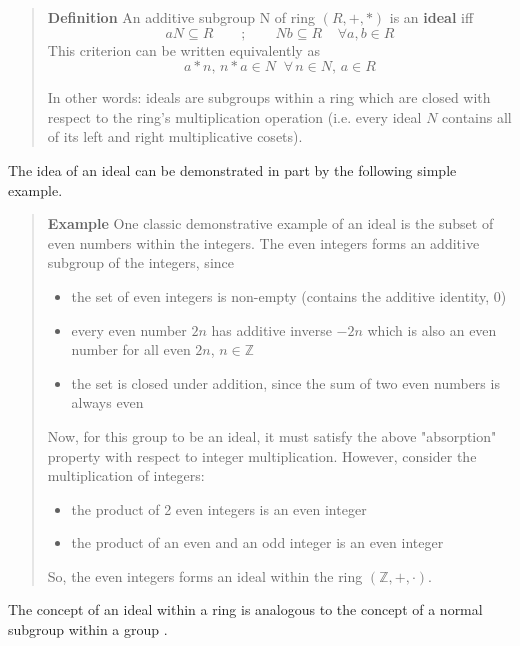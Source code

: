 \documentclass[letterpaper,12pt,titlepage,oneside,final]{book}
\newenvironment{example}{\begin{quote}%
  \textbf{Example }%
  \quad
}{%
\end{quote}%
}
\newenvironment{defn}{\begin{quote}%
  \textbf{Definition }%
  \quad
}{%
\end{quote}%
}
\begin{document}
\begin{defn}\label{defn: Ideals}
  An additive subgroup N of ring ${(R, +, *)}$ is an \textbf{ideal} iff 
  \begin{equation*} aN \subseteq R \qquad ; \qquad Nb \subseteq R \;\;\;\; \forall a, b \in R \end{equation*}
  This criterion can be written equivalently as
  \begin{equation*} a*n, \, n*a \in N \;\; \forall \, n \in N, \, a \in R \end{equation*}
  
  In other words: ideals are subgroups within a ring which are closed with respect to the ring's multiplication operation (i.e. every ideal ${N}$ contains all of its left and right multiplicative cosets).  
\end{defn}

The idea of an ideal can be demonstrated in part by the following simple example.  

\begin{example}\label{ex: Simple ideal}
  One classic demonstrative example of an ideal is the subset of even numbers within the integers.  The even integers forms an additive subgroup of the integers, since 
  \begin{itemize}
    \item the set of even integers is non-empty (contains the additive identity, 0)
    \item every even number ${2n}$ has additive inverse ${-2n}$ which is also an even number for all even ${2n}$, ${n \in \mathbb{Z}}$
    \item the set is closed under addition, since the sum of two even numbers is always even
  \end{itemize}
  Now, for this group to be an ideal, it must satisfy the above "absorption" property with respect to integer multiplication.  However, consider the multiplication of integers:
  \begin{itemize}
    \item the product of 2 even integers is an even integer
    \item the product of an even and an odd integer is an even integer
  \end{itemize}
  So, the even integers forms an ideal within the ring ${(\mathbb{Z}, +, \cdot)}$.
\end{example}

The concept of an ideal within a ring is analogous to the concept of a normal subgroup within a group \cite{Fraleigh}.
\end{document}

